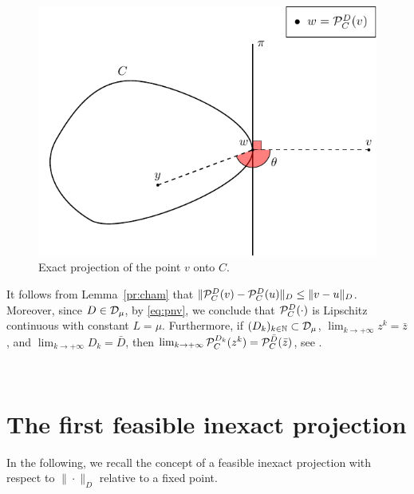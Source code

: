 \begin{figure}[!ht]
	\centering
	\includegraphics{figures/exactProj.pdf}
	\caption{Exact projection of the point $v$ onto $C$.}
	\label{fig:exactProj}
\end{figure}


\begin{remark}\normalfont \label{re:cproj}
	It follows from Lemma~\ref{pr:cham}  that $\|{\cal P}_{C}^{D}(v)-{\cal P}_{C}^{D}(u)\|_{D}\leq \|v-u\|_{D}$.  Moreover, since   $D\in {\cal D}_{\mu}$, by \eqref{eq:pnv}, we conclude that   ${\cal P}_{C}^{D}(\cdot)$ is Lipschitz continuous with constant $L=\mu$.   Furthermore,  if  $(D_k)_{k\in\mathbb{N}}\subset {\cal D}_{\mu}$,    $\lim_{k\to +\infty} z^{k} = \bar{z}$, and   $\lim_{k \to +\infty} D_{k} = \bar{D}$, then $\lim_{k \to +\infty}{\cal P}_{C}^{D_k}(z^{k})= {\cal P}_{C}^{\bar D}(\bar{z})$, see   \cite[Proposition~4.2]{CombettesVu2013}.
\end{remark}\

\section{The first feasible inexact projection}

In the following, we recall  the  concept of a  feasible inexact projection with respect to $\| \cdot \| _{D}$ relative to a fixed point.

